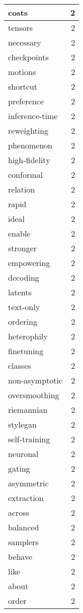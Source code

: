 \begin{table}[h]
\begin{tabular}{|l|r|}
\hline
costs & 2 \\
\hline
tensors & 2 \\
\hline
necessary & 2 \\
\hline
checkpoints & 2 \\
\hline
motions & 2 \\
\hline
shortcut & 2 \\
\hline
preference & 2 \\
\hline
inference-time & 2 \\
\hline
reweighting & 2 \\
\hline
phenomenon & 2 \\
\hline
high-fidelity & 2 \\
\hline
conformal & 2 \\
\hline
relation & 2 \\
\hline
rapid & 2 \\
\hline
ideal & 2 \\
\hline
enable & 2 \\
\hline
stronger & 2 \\
\hline
empowering & 2 \\
\hline
decoding & 2 \\
\hline
latents & 2 \\
\hline
text-only & 2 \\
\hline
ordering & 2 \\
\hline
heterophily & 2 \\
\hline
finetuning & 2 \\
\hline
classes & 2 \\
\hline
non-asymptotic & 2 \\
\hline
oversmoothing & 2 \\
\hline
riemannian & 2 \\
\hline
stylegan & 2 \\
\hline
self-training & 2 \\
\hline
neuronal & 2 \\
\hline
gating & 2 \\
\hline
asymmetric & 2 \\
\hline
extraction & 2 \\
\hline
across & 2 \\
\hline
balanced & 2 \\
\hline
samplers & 2 \\
\hline
behave & 2 \\
\hline
like & 2 \\
\hline
about & 2 \\
\hline
order & 2 \\

\end{tabular}
\end{table}
